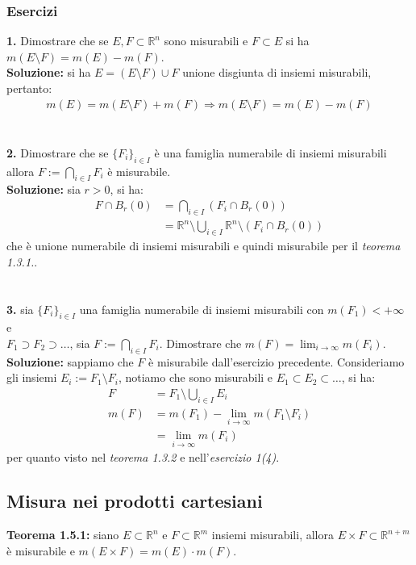 \documentclass{article}
\numberwithin{equation}{subsection}
\begin{document}
\subsubsection{Esercizi}
\textbf{1.} Dimostrare che se $E, F \subset \mathbb{R}^n$ sono misurabili e $F \subset E$ si ha $m(E \setminus F) = m(E) - m(F)$. \\

\textbf{Soluzione:} si ha $E = (E \setminus F) \cup F$ unione disgiunta di insiemi misurabili, pertanto:
\begin{gather*}
    m(E) = m(E \setminus F) + m(F) \Rightarrow m(E \setminus F) = m(E) - m(F) 
\end{gather*}
\\ \\
\textbf{2.} Dimostrare che se $\{ F_i \}_{i \in I}$ è una famiglia numerabile di insiemi misurabili allora $F := \bigcap_{i \in I} F_i$ è misurabile. \\

\textbf{Soluzione:} sia $r > 0$, si ha:
\begin{align*}
    F \cap B_r(0) &= \bigcap_{i \in I} \left(F_i \cap B_r(0) \right)  \\
    &= \mathbb{R}^n \setminus \bigcup_{i \in I} \mathbb{R}^n \setminus (F_i \cap B_r(0)) 
\end{align*}
che è unione numerabile di insiemi misurabili e quindi misurabile per il \textit{teorema 1.3.1.}. \\ \\ \\
\textbf{3.} sia $\{ F_i \}_{i \in I}$ una famiglia numerabile di insiemi misurabili con $m(F_1) < + \infty$ e \\ $F_1 \supset F_2 \supset \dots$, sia $F := \bigcap_{i \in I} F_i$. Dimostrare che $m(F) = \lim_{i \rightarrow \infty} m(F_i)$. \\

\textbf{Soluzione:} sappiamo che $F$ è misurabile dall'esercizio precedente. Consideriamo gli insiemi $E_i := F_1 \setminus F_i$, notiamo che sono misurabili e $E_1 \subset E_2 \subset \dots$, si ha:
\begin{align*}
    F &= F_1 \setminus \bigcup_{i \in I} E_i  \\
    m(F) &= m(F_1) - \lim_{i \rightarrow \infty} m(F_1 \setminus F_i)  \\
    &= \lim_{i \rightarrow \infty} m(F_i) 
\end{align*}
per quanto visto nel \textit{teorema 1.3.2} e nell'\textit{esercizio 1(4)}. \newpage
\subsection{Misura nei prodotti cartesiani}
\textbf{Teorema 1.5.1:} siano $E \subset \mathbb{R}^n$ e $F \subset \mathbb{R}^m$ insiemi misurabili, allora $E \times F \subset \mathbb{R}^{n + m}$ è misurabile e $m(E \times F) = m(E) \cdot m(F)$.\\
\end{document}

